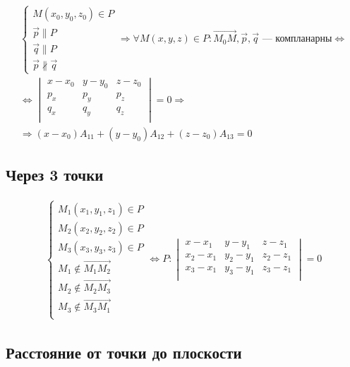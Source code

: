 \documentclass{article}
\begin{document}
\begin{gather*}
	\begin{cases}
		M(x_0, y_0, z_0) \in P \\
		\vec{p} \parallel P \\
		\vec{q} \parallel P \\
		\vec{p} \not \parallel \vec{q}
	\end{cases} \Rightarrow \forall M(x, y, z) \in P : \vec{M_0 M}, \vec{p}, \vec{q} \text{ --- компланарны} \Leftrightarrow \\
	\Leftrightarrow \begin{vmatrix}
		x - x_0 & y - y_0 & z - z_0 \\
		p_x & p_y & p_z \\
		q_x & q_y & q_z \\
	\end{vmatrix} = 0 \Rightarrow\\
	\Rightarrow (x - x_0) A_{11} + (y - y_0) A_{12} + (z - z_0) A_{13} = 0
\end{gather*}

\subsection{Через 3 точки}

\begin{gather*}
	\begin{cases}
		M_1(x_1, y_1, z_1) \in P \\
		M_2(x_2, y_2, z_2) \in P \\
		M_3(x_3, y_3, z_3) \in P \\
		M_1 \not \in \vec{M_1 M_2} \\
		M_2 \not \in \vec{M_2 M_3} \\
		M_3 \not \in \vec{M_3 M_1} \\
	\end{cases} \Leftrightarrow P : \begin{vmatrix}
		x - x_1 & y - y_1 & z - z_1 \\
		x_2 - x_1 & y_2 - y_1 & z_2 - z_1 \\
		x_3 - x_1 & y_3 - y_1 & z_3 - z_1 \\
	\end{vmatrix} = 0
\end{gather*}

\subsection{Расстояние от точки до плоскости}
\end{document}
